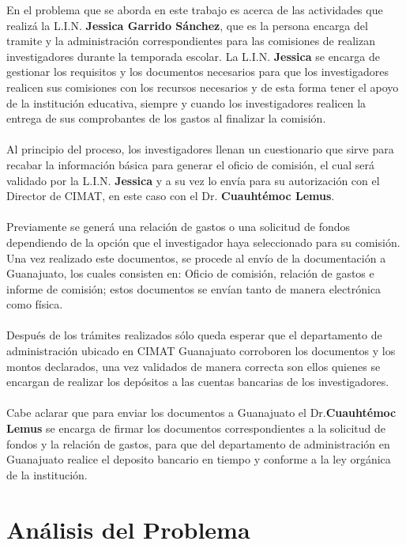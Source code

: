 \documentclass{report}
\begin{document}
    En el problema que se aborda en este trabajo es acerca de las actividades que realizá la L.I.N. \textbf{Jessica Garrido Sánchez}, que es la persona encarga del tramite y la administración correspondientes para las comisiones de realizan investigadores durante la temporada escolar. La L.I.N. \textbf{Jessica} se encarga de gestionar los requisitos y los documentos necesarios para que los investigadores realicen sus comisiones con los recursos necesarios y de esta forma tener el apoyo de la institución educativa, siempre y cuando los investigadores realicen la entrega de sus comprobantes de los gastos al finalizar la comisión.\\\\
Al principio del proceso, los investigadores llenan un cuestionario que sirve para recabar la información básica para generar el oficio de comisión, el cual será validado por la L.I.N. \textbf{Jessica} y a su vez lo envía para su autorización con el Director de CIMAT, en este caso con el Dr. \textbf{Cuauhtémoc Lemus}.\\\\
Previamente se generá una relación de gastos o una solicitud de fondos dependiendo de la opción que el investigador haya seleccionado para su comisión. Una vez realizado este documentos, se procede al envío de la documentación a Guanajuato, los cuales consisten en: Oficio de comisión, relación de gastos e informe de comisión; estos documentos se envían tanto de manera electrónica como física.\\\\
Después de los trámites realizados sólo queda esperar que el departamento de administración ubicado en CIMAT Guanajuato corroboren los documentos y los montos declarados, una vez validados de manera correcta son ellos quienes se encargan de realizar los depósitos a las cuentas bancarias de los investigadores.\\\\
Cabe aclarar que para enviar los documentos a Guanajuato el Dr.\textbf{Cuauhtémoc Lemus} se encarga de firmar los documentos correspondientes a la solicitud de fondos y la relación de gastos, para que del departamento de administración en Guanajuato realice el deposito bancario en tiempo y conforme a la ley orgánica de la institución. 

\chapter{Análisis del Problema}
\end{document}

